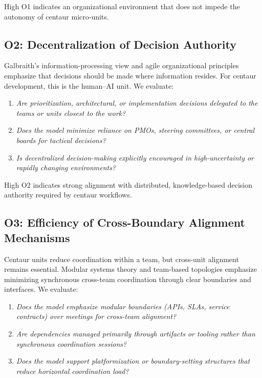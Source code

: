 \documentclass[11pt, a4paper, twocolumn]{article} %
\begin{document}
High O1 indicates an organizational environment that does not impede the
autonomy of centaur micro-units.

\subsection*{O2: Decentralization of Decision Authority}

Galbraith’s information-processing view \citep{galbraith1974} and agile
organizational principles \citep{highsmith2002agile} emphasize that decisions
should be made where information resides. For centaur development, this is the
human--AI unit. We evaluate:

\begin{enumerate}[label=O2.\arabic*), leftmargin=*]
    \item \emph{Are prioritization, architectural, or implementation decisions
    delegated to the teams or units closest to the work?}
    \item \emph{Does the model minimize reliance on PMOs, steering committees,
    or central boards for tactical decisions?}
    \item \emph{Is decentralized decision-making explicitly encouraged in
    high-uncertainty or rapidly changing environments?}
\end{enumerate}

High O2 indicates strong alignment with distributed, knowledge-based decision
authority required by centaur workflows.

\subsection*{O3: Efficiency of Cross-Boundary Alignment Mechanisms}

Centaur units reduce coordination within a team, but cross-unit alignment
remains essential. Modular systems theory \citep{sanchez1996modular} and
team-based topologies \citep{teamtopologies} emphasize minimizing synchronous
cross-team coordination through clear boundaries and interfaces. We evaluate:

\begin{enumerate}[label=O3.\arabic*), leftmargin=*]
    \item \emph{Does the model emphasize modular boundaries (APIs, SLAs,
    service contracts) over meetings for cross-team alignment?}
    \item \emph{Are dependencies managed primarily through artifacts or tooling
    rather than synchronous coordination sessions?}
    \item \emph{Does the model support platformization or boundary-setting
    structures that reduce horizontal coordination load?}
\end{enumerate}
\end{document}
